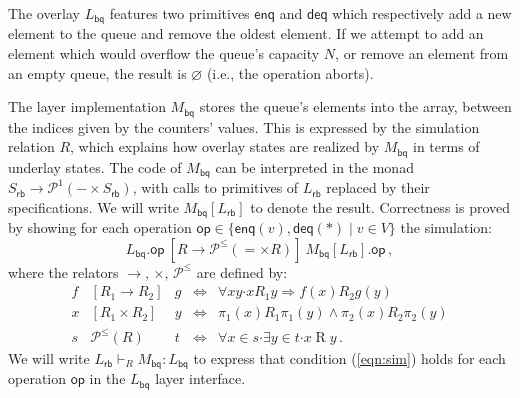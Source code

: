 \documentclass[draft,11pt]{report}
\newcommand{\kw}[1]{\ensuremath{ \mathsf{#1} }}
\newcommand{\bdot}{\boldsymbol{\cdot}}
\begin{document}
The overlay $L_\kw{bq}$ features two primitives
$\kw{enq}$ and $\kw{deq}$
which respectively add a new element to the queue
and remove the oldest element.
If we attempt to add an element
which would overflow the queue's capacity $N$,
or remove an element from an empty queue,
the result is $\varnothing$ (i.e., the operation aborts).


The layer implementation $M_\kw{bq}$ 
stores the queue's elements into the array,
between the indices given by the counters' values.
This is expressed by the simulation relation $R$,
which explains how overlay states are realized by $M_\kw{bq}$ 
in terms of underlay states.
%
The code of $M_\kw{bq}$ can be interpreted in the monad
$
    S_\kw{rb} \rightarrow \mathcal{P}^1(- \times S_\kw{rb})
$,
with calls to primitives of $L_\kw{rb}$
replaced by their specifications.
We will write $M_\kw{bq}[L_\kw{rb}]$ to denote the result.
Correctness is proved by showing
for each operation
$\kw{op} \in \{ \kw{enq}(v), \kw{deq}(*) \mid v \in V \}$
the simulation:
\begin{equation}
  \label{eqn:sim}
  L_\kw{bq}.\kw{op}
  \: \mathrel{[R \rightarrow \mathcal{P}^\le({=} \times R)]} \:
  M_\kw{bq}[L_\kw{rb}].\kw{op} \,,
\end{equation}
where the relators $\rightarrow$, $\times$, $\mathcal{P}^\le$
are defined by:
\[
  \begin{array}{rclcl}
    f & [R_1 \rightarrow R_2] & g & \Leftrightarrow &
    \forall x y \bdot x \mathrel{R_1} y \Rightarrow
    f(x) \mathrel{R_2} g(y) \\
  x & [R_1 \times R_2] & y & \Leftrightarrow &
    \pi_1(x) \mathrel{R_1} \pi_1(y) \wedge
    \pi_2(x) \mathrel{R_2} \pi_2(y) \\
  s & \mathcal{P}^\le(R) & t & \Leftrightarrow &
    \forall x \in s \bdot \exists y \in t \bdot x \mathrel{R} y \,.
  \end{array}
\]
We will write $L_\kw{rb} \vdash_R M_\kw{bq} : L_\kw{bq}$
to express that condition (\ref{eqn:sim}) holds for
each operation $\kw{op}$ in the $L_\kw{bq}$ layer interface.
\end{document}
